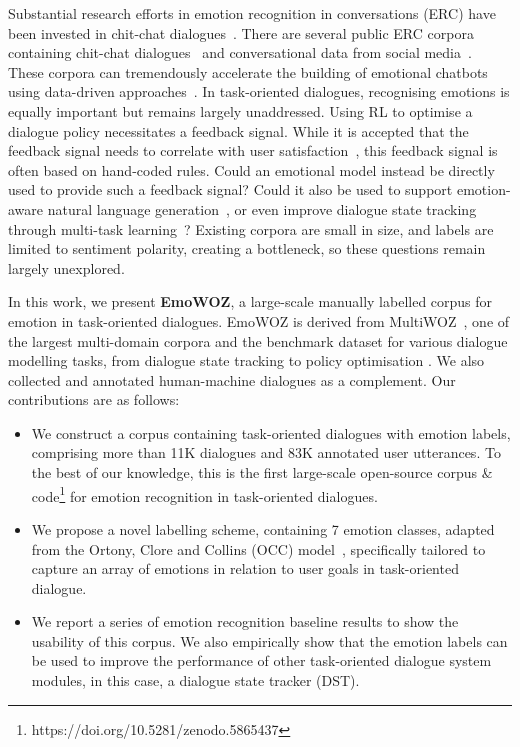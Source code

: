 \documentclass[10pt, a4paper]{article}
\begin{document}
Substantial research efforts in emotion recognition in conversations (ERC) have been invested in chit-chat dialogues~\cite{Majumder_Poria_Hazarika_Mihalcea_Gelbukh_Cambria_2019,ghosal-etal-2020-cosmic}. There are several public ERC corpora containing chit-chat dialogues~\cite{li-etal-2017-dailydialog,poria-etal-2019-meld,zahiri:18a} and conversational data from social media~\cite{zhou-wang-2018-mojitalk}. These corpora can tremendously accelerate the building of emotional chatbots using data-driven approaches~\cite{10.5555/3504035.3504125}. In task-oriented dialogues, recognising emotions is equally important but remains largely unaddressed. Using RL to optimise a dialogue policy necessitates a feedback signal. While it is accepted that the feedback signal needs to correlate with user satisfaction~\cite{Ultes2017DomainIndependentUS}, this feedback signal is often based on hand-coded rules. Could an emotional model instead be directly used to provide such a feedback signal? Could it also be used to support emotion-aware natural language generation~\cite{mairesse-walker-2007-personage}, or even improve dialogue state tracking through multi-task learning~\cite{heck-etal-2020-task}? Existing corpora are small in size, and labels are limited to sentiment polarity, creating a bottleneck, so these questions remain largely unexplored.\par

In this work, we present \textbf{EmoWOZ}, a large-scale manually labelled corpus for emotion in task-oriented dialogues. EmoWOZ is derived from MultiWOZ~\cite{budzianowski-etal-2018-multiwoz}, one of the largest multi-domain corpora and the benchmark dataset for various dialogue modelling tasks, from dialogue state tracking \cite{heck-etal-2020-trippy,lin-etal-2021-knowledge} to policy optimisation \cite{he2022galaxy}. We also collected and annotated human-machine dialogues as a complement. Our contributions are as follows: \par
\begin{itemize}[leftmargin=*]
    \item We construct a corpus containing task-oriented dialogues with emotion labels,
    comprising more than 11K dialogues and 83K annotated user utterances. To the best of our knowledge, this is the first large-scale open-source corpus \& code\footnote{https://doi.org/10.5281/zenodo.5865437} for emotion recognition in task-oriented dialogues.
    \item We propose a novel labelling scheme, containing 7 emotion classes, adapted from the Ortony, Clore and Collins (OCC) model~\cite{ortony_clore_collins_1988}, specifically tailored to capture an array of emotions in relation to user goals in task-oriented dialogue. 
    \item We report a series of emotion recognition baseline results to show the usability of this corpus. We also empirically show that the emotion labels can be used to improve the performance of other task-oriented dialogue system modules, in this case, a dialogue state tracker (DST).
\end{itemize}
\end{document}
